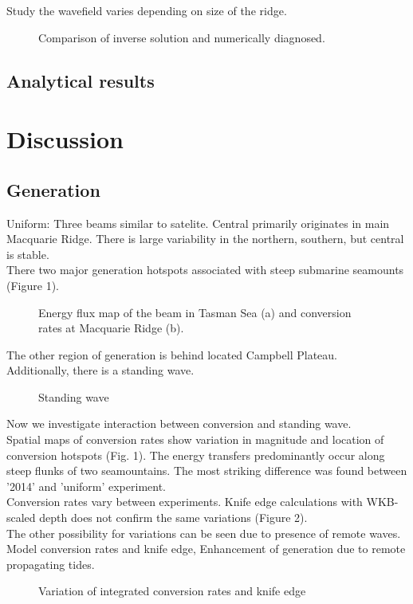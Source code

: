 \documentclass[12pt]{article}
\begin{document}
Study the wavefield varies depending on size of the ridge.
\begin{figure}
	\caption{Comparison of inverse solution and numerically diagnosed.}
\end{figure}
\subsection{Analytical results}

\section{Discussion}
\subsection{Generation}
Uniform: Three beams similar to satelite. Central primarily originates in main Macquarie Ridge. 
There is large  variability in the northern, southern, but central is stable.\\
There two major generation hotspots associated with steep submarine seamounts (Figure 1).\\
\begin{figure}
	\caption{Energy flux map of the beam in Tasman Sea (a) and conversion rates at Macquarie Ridge 
	(b).}
\end{figure}
The other region of generation is behind located Campbell Plateau.\\
Additionally, there is a standing wave.
\begin{figure}
	\caption{Standing wave}
\end{figure}
Now we investigate interaction between conversion and standing wave.\\
Spatial maps of conversion rates show variation in magnitude and location of conversion hotspots 
(Fig. 1). The energy transfers predominantly occur along steep flunks of two seamountains. The most 
striking difference was found between '2014' and 'uniform' experiment.\\

Conversion rates vary between experiments. Knife edge calculations with WKB-scaled depth does not 
confirm the same variations (Figure 2).\\
The other possibility for variations can be seen due to presence of remote waves.
Model conversion rates and knife edge, Enhancement of generation due to remote propagating tides.\\
\begin{figure}
	\caption{Variation of integrated conversion rates and knife edge}
\end{figure}
\end{document}

